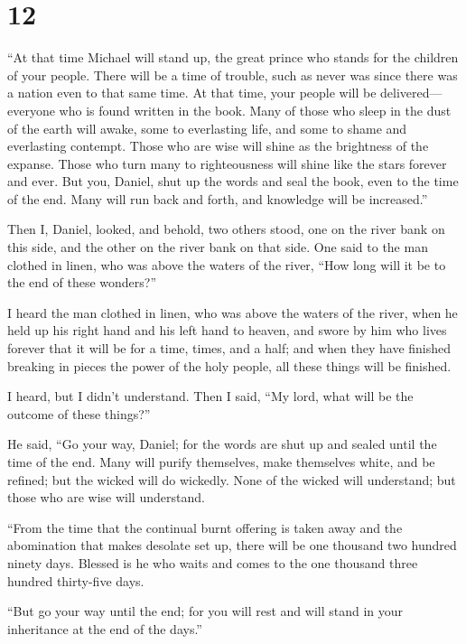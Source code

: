 \hypertarget{section-11}{%
\section{12}\label{section-11}}

 ``At that time Michael will stand up, the great prince who
stands for the children of your people. There will be a time of trouble,
such as never was since there was a nation even to that same time. At
that time, your people will be delivered---everyone who is found written
in the book.  Many of those who sleep in the dust of the
earth will awake, some to everlasting life, and some to shame and
everlasting contempt.  Those who are wise will shine as the
brightness of the expanse. Those who turn many to righteousness will
shine like the stars forever and ever.  But you, Daniel,
shut up the words and seal the book, even to the time of the end. Many
will run back and forth, and knowledge will be increased.''

 Then I, Daniel, looked, and behold, two others stood, one
on the river bank on this side, and the other on the river bank on that
side.  One said to the man clothed in linen, who was above
the waters of the river, ``How long will it be to the end of these
wonders?''

 I heard the man clothed in linen, who was above the waters
of the river, when he held up his right hand and his left hand to
heaven, and swore by him who lives forever that it will be for a time,
times, and a half; and when they have finished breaking in pieces the
power of the holy people, all these things will be finished.

 I heard, but I didn't understand. Then I said, ``My lord,
what will be the outcome of these things?''

 He said, ``Go your way, Daniel; for the words are shut up
and sealed until the time of the end.  Many will purify
themselves, make themselves white, and be refined; but the wicked will
do wickedly. None of the wicked will understand; but those who are wise
will understand.

 ``From the time that the continual burnt offering is taken
away and the abomination that makes desolate set up, there will be one
thousand two hundred ninety days.  Blessed is he who waits
and comes to the one thousand three hundred thirty-five days.

 ``But go your way until the end; for you will rest and
will stand in your inheritance at the end of the days.''

